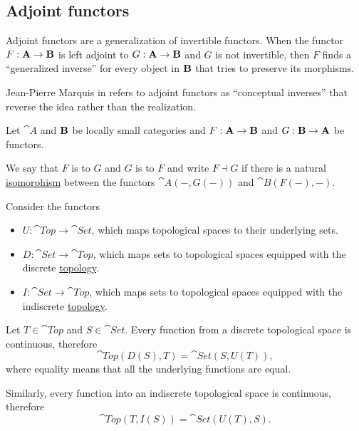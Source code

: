 \subsection{Adjoint functors}\label{subsec:adjoint_functors}

\begin{remark}\label{def:adjoint_functors}
  Adjoint functors are a generalization of invertible functors. When the functor \( F: \operatorname{\mathbf{A}} \to \operatorname{\mathbf{B}} \) is left adjoint to \( G: \operatorname{\mathbf{A}} \to \operatorname{\mathbf{B}} \) and \( G \) is not invertible, then \( F \) finds a \enquote{generalized inverse} for every object in \( \operatorname{\mathbf{B}} \) that tries to preserve its morphisms.

  Jean-Pierre Marquis in \cite{StanfordPlato:category_theory} refers to adjoint functors as \enquote{conceptual inverses} that reverse the idea rather than the realization.
\end{remark}

\begin{definition}\label{def:adjoint_functor}\mcite\cite[exer. 4.1.32]{Leinster2016Basic}
  Let \( \cat{A} \) and \( \operatorname{\mathbf{B}} \) be locally small categories and \( F: \operatorname{\mathbf{A}} \to \operatorname{\mathbf{B}} \) and \( G: \operatorname{\mathbf{B}} \to \operatorname{\mathbf{A}} \) be functors.

  We say that \( F \) is  to \( G \) and \( G \) is  to \( F \) and write \( F \dashv G \) if there is a natural \hyperref[def:natural_isomorpism]{isomorphism} between the functors \( \cat{A}(-, G(-)) \) and \( \cat{B}(F(-), -) \).
\end{definition}

\begin{example}\label{ex:top_adjoint_functor}\mcite\cite[exmpl. 2.1.5]{Leinster2016Basic}
  Consider the functors
  \begin{itemize}
    \item \( U: \cat{Top} \to \cat{Set} \), which maps topological spaces to their underlying sets.
    \item \( D: \cat{Set} \to \cat{Top} \), which maps sets to topological spaces equipped with the discrete \hyperref[def:standard_topologies/discrete]{topology}.
    \item \( I: \cat{Set} \to \cat{Top} \), which maps sets to topological spaces equipped with the indiscrete \hyperref[def:standard_topologies/indiscrete]{topology}.
  \end{itemize}

  Let \( T \in \cat{Top} \) and \( S \in \cat{Set} \). Every function from a discrete topological space is continuous, therefore
  \begin{equation*}
    \cat{Top}(D(S), T) = \cat{Set}(S, U(T)),
  \end{equation*}
  where equality means that all the underlying functions are equal.

  Similarly, every function into an indiscrete topological space is continuous, therefore
  \begin{equation*}
    \cat{Top}(T, I(S)) = \cat{Set}(U(T), S).
  \end{equation*}
\end{example}
